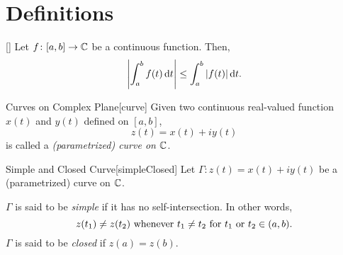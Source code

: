 \documentclass[../complex_variables_1.tex]{subfiles}
\begin{document}
\section{Definitions}

\begin{Lemma}{}[]
    Let \(f \colon [a, b] \to \CC\) be a continuous function.
    Then,
    \[
        \left| \int_a^b f(t) \,\mathrm{d} t \right|
        \le \int_a^b |f(t)| \,\mathrm{d} t\text.
    \]
\end{Lemma}
\begin{myproof}[Proof]
\end{myproof}

\begin{Definition}{Curves on Complex Plane}[curve]
    Given two continuous real-valued function
    \(x(t)\) and \(y(t)\) defined on \([a, b]\),
    \[
        z(t) = x(t) + iy(t)
    \]
    is called a \emph{(parametrized) curve on \(\CC\)}.
\end{Definition}

\begin{Definition}{Simple and Closed Curve}[simpleClosed]
    Let \(\Gamma \colon z(t) = x(t) + iy(t)\) be a
    (parametrized) curve on \(\CC\).
    \begin{enumerate}[label=(\roman*)]
        \ii
        \(\Gamma\) is said to be \emph{simple}
        if it has no self-intersection. In other words,
        \[
            z(t_1) \neq z(t_2)\text{ whenever }
            t_1 \neq t_2\text{ for }t_1\text{ or }t_2 \in (a, b)\text.
        \]
        \ii
        \(\Gamma\) is said to be \emph{closed}
        if \(z(a) = z(b)\).
    \end{enumerate}
\end{Definition}
\end{document}
